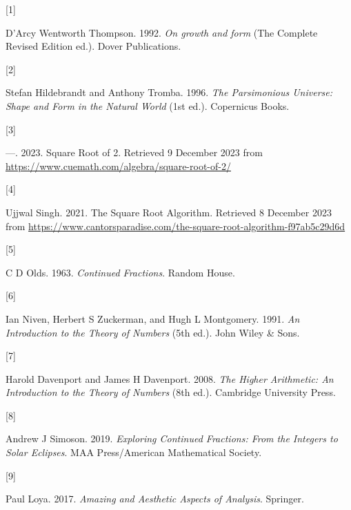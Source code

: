 \documentclass[
  a4paper,
]{article}
\newlength{\cslhangindent}
\newlength{\csllabelwidth}
\newenvironment{CSLReferences}[2] %
 {\begin{list}{}{%
  \setlength{\itemindent}{0pt}
  \setlength{\leftmargin}{0pt}
  \setlength{\parsep}{0pt}
  \ifodd #1
   \setlength{\leftmargin}{\cslhangindent}
   \setlength{\itemindent}{-1\cslhangindent}
  \fi
  \setlength{\itemsep}{#2\baselineskip}}}
 {\end{list}}
\newcommand{\CSLLeftMargin}[1]{\parbox[t]{\csllabelwidth}{\strut#1\strut}}
\newcommand{\CSLRightInline}[1]{\parbox[t]{\linewidth - \csllabelwidth}{\strut#1\strut}}
\begin{document}
\label{refs}
\begin{CSLReferences}{0}{0}
\CSLLeftMargin{{[}1{]} }%
\CSLRightInline{D'Arcy Wentworth Thompson. 1992. \emph{On growth and
form} (The Complete Revised Edition ed.). Dover Publications.}

\CSLLeftMargin{{[}2{]} }%
\CSLRightInline{Stefan Hildebrandt and Anthony Tromba. 1996. \emph{{The
Parsimonious Universe: Shape and Form in the Natural World}} (1st ed.).
Copernicus Books.}

\CSLLeftMargin{{[}3{]} }%
\CSLRightInline{---. 2023. {Square Root of 2}. Retrieved 9 December 2023
from \url{https://www.cuemath.com/algebra/square-root-of-2/}}

\CSLLeftMargin{{[}4{]} }%
\CSLRightInline{Ujjwal Singh. 2021. {The Square Root Algorithm}.
Retrieved 8 December 2023 from
\url{https://www.cantorsparadise.com/the-square-root-algorithm-f97ab5c29d6d}}

\CSLLeftMargin{{[}5{]} }%
\CSLRightInline{C D Olds. 1963. \emph{{Continued Fractions}}. Random
House.}

\CSLLeftMargin{{[}6{]} }%
\CSLRightInline{Ian Niven, Herbert S Zuckerman, and Hugh L Montgomery.
1991. \emph{{An Introduction to the Theory of Numbers}} (5th ed.). John
Wiley \& Sons.}

\CSLLeftMargin{{[}7{]} }%
\CSLRightInline{Harold Davenport and James H Davenport. 2008. \emph{{The
Higher Arithmetic}: {An Introduction to the Theory of Numbers}} (8th
ed.). Cambridge University Press.}

\CSLLeftMargin{{[}8{]} }%
\CSLRightInline{Andrew J Simoson. 2019. \emph{{Exploring Continued
Fractions}: {From the Integers to Solar Eclipses}}. MAA Press/American
Mathematical Society.}

\CSLLeftMargin{{[}9{]} }%
\CSLRightInline{Paul Loya. 2017. \emph{{Amazing and Aesthetic Aspects of
Analysis}}. Springer.}

\end{CSLReferences}
\end{document}
